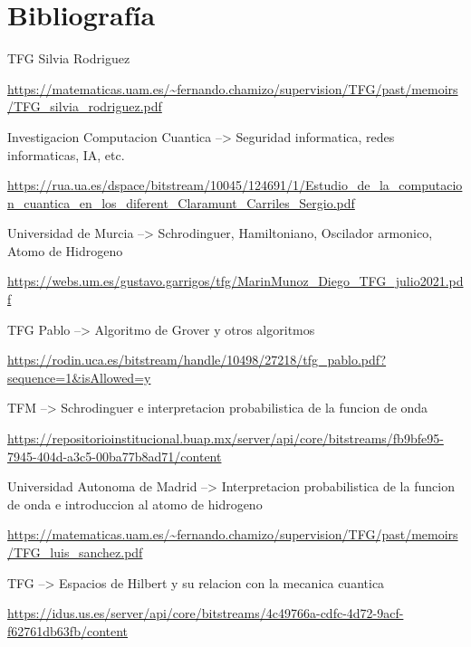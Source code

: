 \documentclass{article}
\numberwithin{equation}{section} %
\begin{document}
    \newpage
    \thispagestyle{empty}
    \mbox{}
    \newpage

    \section{Bibliografía}

        \vspace{5mm}

        TFG Silvia Rodriguez\par
        \url{https://matematicas.uam.es/~fernando.chamizo/supervision/TFG/past/memoirs/TFG\_silvia\_rodriguez.pdf}
        \vspace{2mm}

        Investigacion Computacion Cuantica --> Seguridad informatica, redes informaticas, IA, etc.\par
        \url{https://rua.ua.es/dspace/bitstream/10045/124691/1/Estudio\_de\_la\_computacion\_cuantica\_en\_los\_diferent\_Claramunt\_Carriles\_Sergio.pdf}
        \vspace{2mm}

        Universidad de Murcia --> Schrodinguer, Hamiltoniano, Oscilador armonico, Atomo de Hidrogeno\par
        \url{https://webs.um.es/gustavo.garrigos/tfg/MarinMunoz\_Diego\_TFG\_julio2021.pdf}
        \vspace{2mm}

        TFG Pablo --> Algoritmo de Grover y otros algoritmos\par
        \url{https://rodin.uca.es/bitstream/handle/10498/27218/tfg\_pablo.pdf?sequence=1\&isAllowed=y}
        \vspace{2mm}

        TFM --> Schrodinguer e interpretacion probabilistica de la funcion de onda\par
        \url{https://repositorioinstitucional.buap.mx/server/api/core/bitstreams/fb9bfe95-7945-404d-a3c5-00ba77b8ad71/content}
        \vspace{2mm}

        Universidad Autonoma de Madrid --> Interpretacion probabilistica de la funcion de onda e introduccion al atomo de hidrogeno\par
        \url{https://matematicas.uam.es/~fernando.chamizo/supervision/TFG/past/memoirs/TFG\_luis\_sanchez.pdf}
        \vspace{2mm}

        TFG --> Espacios de Hilbert y su relacion con la mecanica cuantica\par
        \url{https://idus.us.es/server/api/core/bitstreams/4c49766a-cdfc-4d72-9acf-f62761db63fb/content}
        \vspace{2mm}
\end{document}
